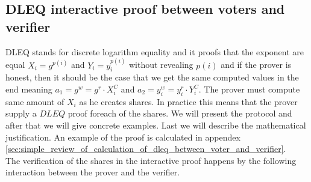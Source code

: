 \subsection{DLEQ interactive proof between voters and verifier} \label{sec:dleq_voter_verifier}
DLEQ stands for discrete logarithm equality and it proofs that the exponent are equal $X_i=g^{p(i)}$ and  $Y_i=y_i^{p(i)}$ without revealing \begin{math}{p(i)} \end{math} and if the prover is honest, then it should be the case that we get the same computed values in the end meaning $a_1 = g^w= g^r \cdot X_i^C$ and $a_2= y_i^w = y_i^r \cdot Y_i^C$. The prover must compute same amount of $X_i$ as he creates shares. In practice this means that the prover supply a $DLEQ$ proof foreach of the shares. We will present the protocol and after that we will give concrete examples. Last we will describe the mathematical justification. An example of the proof is calculated in appendex \ref{sec:simple_review_of_calculation_of_dleq_between_voter_and_verifier}. \\

\noindent
The verification of the shares in the interactive proof happens by the following  interaction between the prover and the verifier.


